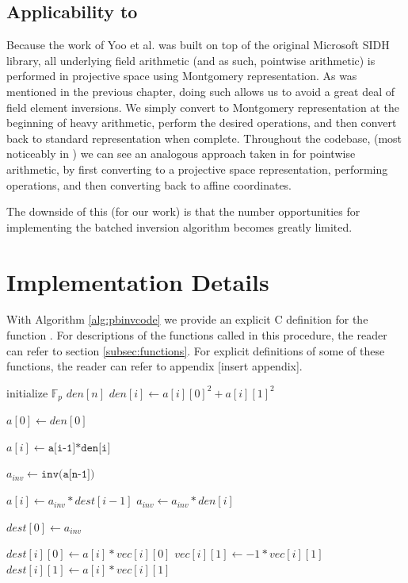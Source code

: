 \subsection{Applicability to \sidh}

Because the work of Yoo et al. was built on top of the original Microsoft SIDH library, all underlying field arithmetic (and as such, pointwise arithmetic) is performed in projective space using Montgomery representation. As was mentioned in the previous chapter, doing such allows us to avoid a great deal of field element inversions. We simply convert to Montgomery representation at the beginning of heavy arithmetic, perform the desired operations, and then convert back to standard representation when complete. Throughout the codebase, (most noticeably in ) we can see an analogous approach taken in for pointwise arithmetic, by first converting to a projective space representation, performing operations, and then converting back to affine coordinates. 

 The downside of this (for our work) is that the number opportunities for implementing the batched inversion algorithm becomes greatly limited.\\

\section{Implementation Details}
\label{sec:pbinvimplementation}

With Algorithm \ref{alg:pbinvcode} we provide an explicit C definition for the function . For descriptions of the functions called in this procedure, the reader can refer to section \ref{subsec:functions}. For explicit definitions of some of these functions, the reader can refer to appendix [insert appendix].

\begin{algorithm}
\caption{-- }\label{alg:pbinvcode}
\begin{algorithmic}[1]
\State initialize $\mathbb{F}_{p}$ $den[n]$
	\State $den[i] \gets a[i][0]^{2} + a[i][1]^{2}$
\EndFor

\State $a[0] \gets den[0]$

	\State $a[i] \gets \texttt{a[i-1]*den[i]}$
\EndFor

\State $a_{inv} \gets \texttt{inv(a[n-1])}$

	\State $a[i] \gets a_{inv}*dest[i-1]$
	\State $a_{inv} \gets a_{inv}*den[i]$
\EndFor

\State $dest[0] \gets a_{inv}$

	\State $dest[i][0] \gets a[i]*vec[i][0]$
	\State $vec[i][1] \gets -1*vec[i][1]$
	\State $dest[i][1] \gets a[i]*vec[i][1]$
\EndFor
\EndProcedure
\end{algorithmic}
\end{algorithm}

